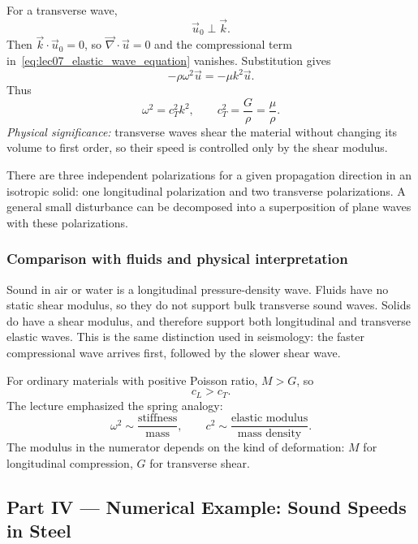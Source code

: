 \documentclass[../main.tex]{subfiles}
\begin{document}
For a transverse wave,
\begin{equation}
    \vec{u}_0\perp\vec{k}.
    \label{eq:lec07_transverse_polarization}
\end{equation}
Then $\vec{k}\cdot\vec{u}_0=0$, so $\vec{\nabla}\cdot\vec{u}=0$ and the compressional term in~\eqref{eq:lec07_elastic_wave_equation} vanishes. Substitution gives
\[
    -\rho\omega^2\vec{u}
    =-\mu k^2\vec{u}.
\]
Thus
\begin{equation}
    \boxed{
    \omega^2=c_T^2k^2,
    \qquad
    c_T^2=\frac{G}{\rho}=\frac{\mu}{\rho}.}
    \label{eq:lec07_transverse_speed}
\end{equation}
\textit{Physical significance:} transverse waves shear the material without changing its volume to first order, so their speed is controlled only by the shear modulus.

There are three independent polarizations for a given propagation direction in an isotropic solid: one longitudinal polarization and two transverse polarizations. A general small disturbance can be decomposed into a superposition of plane waves with these polarizations.

\subsubsection*{Comparison with fluids and physical interpretation}

Sound in air or water is a longitudinal pressure-density wave. Fluids have no static shear modulus, so they do not support bulk transverse sound waves. Solids do have a shear modulus, and therefore support both longitudinal and transverse elastic waves. This is the same distinction used in seismology: the faster compressional wave arrives first, followed by the slower shear wave.

For ordinary materials with positive Poisson ratio, $M>G$, so
\begin{equation}
    c_L>c_T.
    \label{eq:lec07_speed_ordering}
\end{equation}
The lecture emphasized the spring analogy:
\[
    \omega^2\sim \frac{\text{stiffness}}{\text{mass}},
    \qquad
    c^2\sim \frac{\text{elastic modulus}}{\text{mass density}}.
\]
The modulus in the numerator depends on the kind of deformation: $M$ for longitudinal compression, $G$ for transverse shear.

\subsection*{Part IV — Numerical Example: Sound Speeds in Steel}
\end{document}
